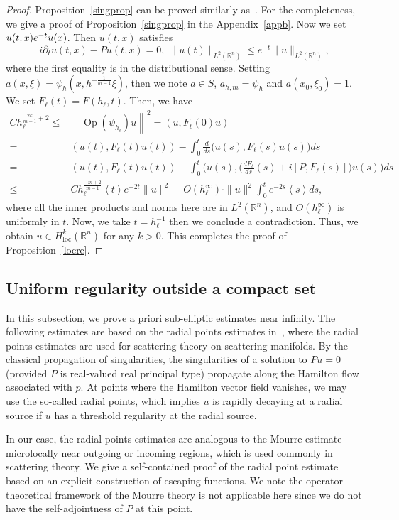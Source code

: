 \documentclass[10pt]{amsart}
\theoremstyle{definition}
\let\coloneqq\relax
\newcommand*\g{\psi}
\newcommand*\x{\xi}
\DeclareMathOperator{\Op}{Op}
\newcommand*\re{\mathbb{R}}
\newcommand*\pa{\partial}
\newcommand*\coloneqq{\mathrel{\mathop:}=}
\DeclareMathOperator{\loc}{loc}
\newcommand{\jap}[1]{\left\langle #1 \right\rangle}
\newcommand{\bigpare}[1]{\bigl(#1\bigr)}
\newcommand{\biggpare}[1]{\biggl(#1\biggr)}
\begin{document}
\begin{proof}
Proposition~\ref{singprop} can be proved similarly as~\cite[Lemma~9]{N}. For the completeness, we give a proof of Proposition~\ref{singprop} in the Appendix~\ref{appb}. Now we set $u(t, x) \coloneqq e^{-t}u(x) $. Then $u(t,x)$ satisfies
\[
i\pa_tu(t,x) - Pu(t,x) = 0,\;\|u(t) \|_{L^2(\re^n)} \leq e^{-t}\|u\|_{L^2(\re^n)},
\]
where the first equality is in the distributional sense. Setting $a(x,\x)=\g_h(x,h^{-\frac{1}{m-1}}\x)$, then we note $a\in S$, $a_{h,m}=\g_h$ and $a(x_0,\x_0)=1$. We set $F_{\ell}(t) = F(h_{\ell},t)$. Then, we have
\begin{align*}
Ch_{\ell}^{\frac{2k}{m-1}+2} \leq & \left\|\Op(\g_{h_{\ell}})u\right\|^2=(u, F_{\ell}(0)u)\\
= & \left(u(t), F_{\ell}(t)u(t)\right)- \int_0^t \frac{d}{ds}\bigpare{u(s), F_{\ell}(s)u(s)}ds\\
= & \left(u(t), F_{\ell}(t)u(t)\right) - \int_0^t \biggpare{u(s), \biggpare{\frac{dF_{\ell}}{ds}(s) + i[P, F_{\ell}(s)]}u(s)} ds\\
\leq & Ch_{\ell}^{\frac{-m+2}{m-1}}\jap{t}e^{-2t}\|u\|^2 + O(h_{\ell}^{\infty})\cdot \|u\|^2 \int_0^te^{-2s}\jap{s}ds,
\end{align*}
where all the inner products and norms here are in $L^2(\re^n)$, and $O(h_{\ell}^{\infty})$ is uniformly in $t$. Now, we take $t = h_{\ell}^{-1}$ then we conclude a contradiction. Thus, we obtain $u\in H^k_{\loc}(\re^n)$ for any $k>0$. This completes the proof of Proposition~\ref{locre}.
\end{proof}



\subsection{Uniform regularity outside a compact set}\label{global}

In this subsection, we prove a priori sub-elliptic estimates near infinity. The following estimates are based on the radial points estimates in~\cite{M}, where the radial points estimates are used for scattering theory on scattering manifolds. By the classical propagation of singularities, the singularities of a solution to $Pu=0$ (provided $P$ is real-valued real principal type) propagate along the Hamilton flow associated with $p$. At points where the Hamilton vector field vanishes, we may use the so-called radial points, which implies $u$ is rapidly decaying at a radial source if $u$ has a threshold regularity at the radial source.

In our case, the radial points estimates are analogous to the Mourre estimate microlocally near outgoing or incoming regions, which is used commonly in scattering theory. We give a self-contained proof of the radial point estimate based on an explicit construction of escaping functions. We note the operator theoretical framework of the Mourre theory is not applicable here since we do not have the self-adjointness of $P$ at this point.
\end{document}
